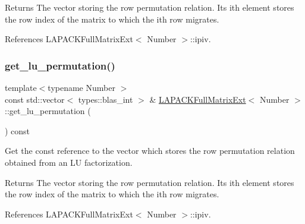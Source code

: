 \begin{DoxyReturn}{Returns}
The vector storing the row permutation relation. Its i\textquotesingle{}th element stores the row index of the matrix to which the i\textquotesingle{}th row migrates. 
\end{DoxyReturn}


References L\+A\+P\+A\+C\+K\+Full\+Matrix\+Ext$<$ Number $>$\+::ipiv.

\mbox{\label{classLAPACKFullMatrixExt_a2f435bd8d68ef6da859405ff5c583cd0}} 
\subsubsection{\texorpdfstring{get\+\_\+lu\+\_\+permutation()}{get\_lu\_permutation()}\hspace{0.1cm}{\footnotesize\ttfamily [2/2]}}
{\footnotesize\ttfamily template$<$typename Number $>$ \\
const std\+::vector$<$ types\+::blas\+\_\+int $>$ \& \hyperlink{classLAPACKFullMatrixExt}{L\+A\+P\+A\+C\+K\+Full\+Matrix\+Ext}$<$ Number $>$\+::get\+\_\+lu\+\_\+permutation (\begin{DoxyParamCaption}{ }\end{DoxyParamCaption}) const}

Get the const reference to the vector which stores the row permutation relation obtained from an LU factorization.

\begin{DoxyReturn}{Returns}
The vector storing the row permutation relation. Its i\textquotesingle{}th element stores the row index of the matrix to which the i\textquotesingle{}th row migrates. 
\end{DoxyReturn}


References L\+A\+P\+A\+C\+K\+Full\+Matrix\+Ext$<$ Number $>$\+::ipiv.

\mbox{\label{classLAPACKFullMatrixExt_abc010374ccacc6d1e482196af807d247}} 
